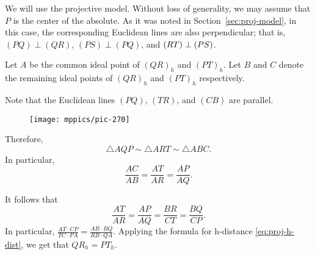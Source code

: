 We will use the projective model.
Without loss of generality, we may assume that $P$ is the center of the absolute.
As it was noted in Section~\ref{sec:proj-model},
in this case, the corresponding Euclidean lines are also perpendicular;
that is, $(PQ)\perp (QR)$, $(PS)\perp(PQ)$, and $(RT)\z\perp (PS)$.

Let $A$ be the common ideal point of $(QR)_h$ and $(PT)_h$.
Let $B$ and $C$ denote the remaining ideal points of $(QR)_h$ and $(PT)_h$ respectively.

Note that the Euclidean lines $(PQ)$, $(TR)$, and $(CB)$ are parallel.

\begin{wrapfigure}{o}{55mm}
\vskip-2mm
\centering
\texttt{[image: mppics/pic-270]}
\vskip2mm
\end{wrapfigure}

Therefore, 
\[\triangle AQP\sim \triangle ART \sim\triangle ABC.\]
In particular,
\[\frac{AC}{AB}=\frac{AT}{AR}=\frac{AP}{AQ}.\]

It follows that
\[\frac{AT}{AR}=\frac{AP}{AQ}=\frac{BR}{CT}=\frac{BQ}{CP}.\]
In particular, $\tfrac{AT\cdot CP}{TC\cdot PA}=\tfrac{AR\cdot BQ}{RB\cdot QA}$.
Applying the formula for h-distance \ref{eq:proj-h-dist}, we get that $QR_h=PT_h$.
\qeds
